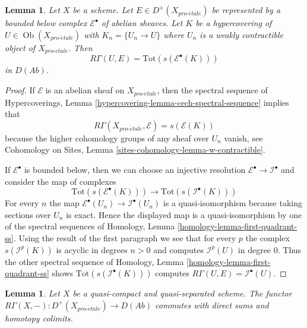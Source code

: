 \documentclass{stacks-project}
\theoremstyle{plain}
\newtheorem{lemma}[subsection]{Lemma}
\theoremstyle{definition}
\theoremstyle{remark}
\numberwithin{equation}{subsection}
\def\Ob{\mathop{\mathrm{Ob}}\nolimits}
\def\proetale{{pro\text{-}\acute{e}tale}}
\begin{document}
\begin{lemma}
\label{lemma-compute-cohomology}
Let $X$ be a scheme. Let $E \in D^+(X_\proetale)$ be represented by
a bounded below complex $\mathcal{E}^\bullet$ of abelian sheaves.
Let $K$ be a hypercovering of $U \in \Ob(X_\proetale)$ with
$K_n = \{U_n \to U\}$ where $U_n$ is a weakly contractible object of
$X_\proetale$. Then
$$
R\Gamma(U, E) = \text{Tot}(s(\mathcal{E}^\bullet(K)))
$$
in $D(\textit{Ab})$.
\end{lemma}

\begin{proof}
If $\mathcal{E}$ is an abelian
sheaf on $X_\proetale$, then the spectral sequence of
Hypercoverings, Lemma \ref{hypercovering-lemma-cech-spectral-sequence}
implies that
$$
R\Gamma(X_\proetale, \mathcal{E}) = s(\mathcal{E}(K))
$$
because the higher cohomology groups of any sheaf over $U_n$ vanish, see
Cohomology on Sites, Lemma \ref{sites-cohomology-lemma-w-contractible}.

\medskip\noindent
If $\mathcal{E}^\bullet$ is bounded below, then we can choose an injective
resolution $\mathcal{E}^\bullet \to \mathcal{I}^\bullet$ and consider
the map of complexes
$$
\text{Tot}(s(\mathcal{E}^\bullet(K)))
\longrightarrow
\text{Tot}(s(\mathcal{I}^\bullet(K)))
$$
For every $n$ the map $\mathcal{E}^\bullet(U_n) \to \mathcal{I}^\bullet(U_n)$
is a quasi-isomorphism because taking sections over $U_n$ is exact.
Hence the displayed map is a quasi-isomorphism by one of the spectral
sequences of
Homology, Lemma \ref{homology-lemma-first-quadrant-ss}.
Using the result of the first paragraph we see that for every $p$
the complex $s(\mathcal{I}^p(K))$ is acyclic in degrees $n > 0$ and
computes $\mathcal{I}^p(U)$ in degree $0$. Thus the other spectral
sequence of
Homology, Lemma \ref{homology-lemma-first-quadrant-ss}
shows $\text{Tot}(s(\mathcal{I}^\bullet(K)))$ computes
$R\Gamma(U, E) = \mathcal{I}^\bullet(U)$.
\end{proof}

\begin{lemma}
\label{lemma-quasi-compact-quasi-separated-commutes-direct-sums}
Let $X$ be a quasi-compact and quasi-separated scheme.
The functor $R\Gamma(X, -) : D^+(X_\proetale) \to D(\textit{Ab})$
commutes with direct sums and homotopy colimits.
\end{lemma}
\end{document}

